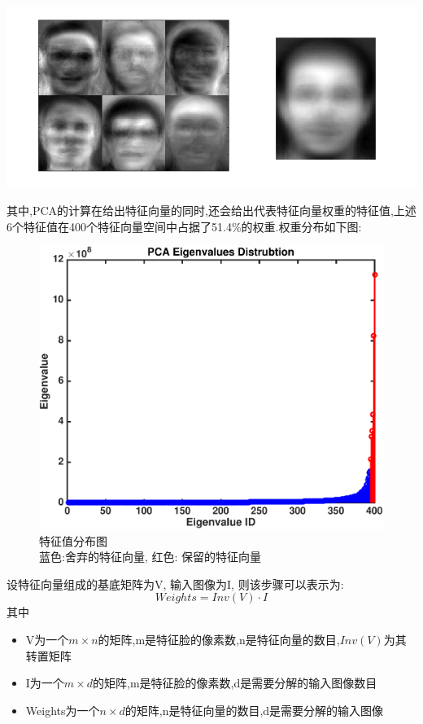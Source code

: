\begin{center}
\begin{minipage}[t]{\linewidth}
\center
{
\includegraphics[width=\MyFactor\textwidth]{Img/pca_eigenspace.png} 
}
\end{minipage}
\medskip
\end{center}

其中,PCA的计算在给出特征向量的同时,还会给出代表特征向量权重的特征值,上述6个特征值在400个特征向量空间中占据了51.4\%的权重.权重分布如下图:

\begin{figure}[!htbp]
\centering \includegraphics[width=\MyFactor\textwidth]{Img/pca_eivalue.pdf} 
\caption{特征值分布图 \\ 蓝色:舍弃的特征向量, 红色: 保留的特征向量}
\end{figure}
设特征向量组成的基底矩阵为V, 输入图像为I, 则该步骤可以表示为:
\begin{equation}
Weights = Inv(V) \cdot I
\end{equation}
其中
\begin{itemize}
	\item V为一个$m  \times  n$的矩阵,m是特征脸的像素数,n是特征向量的数目,$Inv(V)$为其转置矩阵
	\item I为一个$m \times d$的矩阵,m是特征脸的像素数,d是需要分解的输入图像数目
	\item Weights为一个$n \times d$的矩阵,n是特征向量的数目,d是需要分解的输入图像
\end{itemize}


